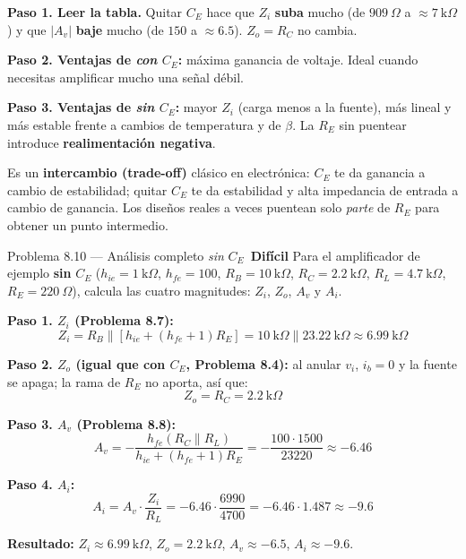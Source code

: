 \documentclass[11pt,a4paper]{article}
\newcommand{\dificil}{\textcolor{rojoAlerta}{\faIcon{circle}\,\textbf{Difícil}}}
\begin{document}
\begin{solucionBox}
\textbf{Paso 1. Leer la tabla.} Quitar $C_E$ hace que $Z_i$ \textbf{suba} mucho (de $909\ \Omega$ a $\approx7\ \text{k}\Omega$) y que $|A_v|$ \textbf{baje} mucho (de $150$ a $\approx6.5$). $Z_o=R_C$ no cambia.

\textbf{Paso 2. Ventajas de \emph{con} $C_E$:} máxima ganancia de voltaje. Ideal cuando necesitas amplificar mucho una señal débil.

\textbf{Paso 3. Ventajas de \emph{sin} $C_E$:} mayor $Z_i$ (carga menos a la fuente), más lineal y más estable frente a cambios de temperatura y de $\beta$. La $R_E$ sin puentear introduce \textbf{realimentación negativa}.
\end{solucionBox}

\begin{porqueBox}
Es un \textbf{intercambio (trade-off)} clásico en electrónica: $C_E$ te da ganancia a cambio de estabilidad; quitar $C_E$ te da estabilidad y alta impedancia de entrada a cambio de ganancia. Los diseños reales a veces puentean solo \emph{parte} de $R_E$ para obtener un punto intermedio.
\end{porqueBox}

\begin{problemaBox}{Problema 8.10 --- Análisis completo \emph{sin} $C_E$ \quad \dificil}
Para el amplificador de ejemplo \textbf{sin} $C_E$ ($h_{ie}=1\ \text{k}\Omega$, $h_{fe}=100$, $R_B=10\ \text{k}\Omega$, $R_C=2.2\ \text{k}\Omega$, $R_L=4.7\ \text{k}\Omega$, $R_E=220\ \Omega$), calcula las cuatro magnitudes: $Z_i$, $Z_o$, $A_v$ y $A_i$.
\end{problemaBox}

\begin{solucionBox}
\textbf{Paso 1. $Z_i$ (Problema 8.7):}
\[
Z_i=R_B\parallel[h_{ie}+(h_{fe}+1)R_E]=10\ \text{k}\Omega\parallel23.22\ \text{k}\Omega\approx6.99\ \text{k}\Omega
\]

\textbf{Paso 2. $Z_o$ (igual que con $C_E$, Problema 8.4):} al anular $v_i$, $i_b=0$ y la fuente se apaga; la rama de $R_E$ no aporta, así que:
\[
Z_o=R_C=2.2\ \text{k}\Omega
\]

\textbf{Paso 3. $A_v$ (Problema 8.8):}
\[
A_v=-\frac{h_{fe}(R_C\parallel R_L)}{h_{ie}+(h_{fe}+1)R_E}=-\frac{100\cdot1500}{23220}\approx-6.46
\]

\textbf{Paso 4. $A_i$:}
\[
A_i=A_v\cdot\frac{Z_i}{R_L}=-6.46\cdot\frac{6990}{4700}=-6.46\cdot1.487\approx-9.6
\]

\textbf{Resultado:} $Z_i\approx6.99\ \text{k}\Omega$, $Z_o=2.2\ \text{k}\Omega$, $A_v\approx-6.5$, $A_i\approx-9.6$.
\end{solucionBox}
\end{document}
